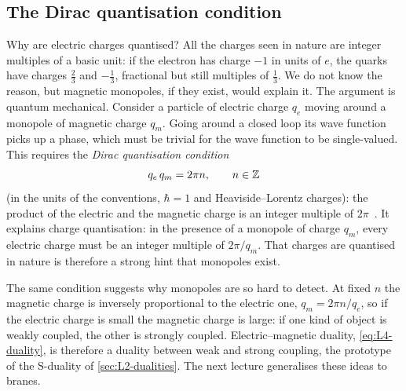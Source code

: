 \subsection{The Dirac quantisation condition}

Why are electric charges quantised? All the charges seen in nature are integer multiples of a basic unit: if the electron has charge $-1$ in units of $e$, the quarks have charges $\frac23$ and $-\frac13$, fractional but still multiples of $\frac13$. We do not know the reason, but magnetic monopoles, if they exist, would explain it. The argument is quantum mechanical. Consider a particle of electric charge $q_e$ moving around a monopole of magnetic charge $q_m$. Going around a closed loop its wave function picks up a phase, which must be trivial for the wave function to be single-valued. This requires the \emph{Dirac quantisation condition}
\begin{equation}
  q_e\,q_m = 2\pi n ,\qquad n\in\mathbb{Z}
  \label{eq:L4-dirac}
\end{equation}
(in the units of the conventions, $\hbar = 1$ and Heaviside--Lorentz charges): the product of the electric and the magnetic charge is an integer multiple of $2\pi$~\cite{Dirac}. It explains charge quantisation: in the presence of a monopole of charge $q_m$, every electric charge must be an integer multiple of $2\pi/q_m$. That charges are quantised in nature is therefore a strong hint that monopoles exist.

The same condition suggests why monopoles are so hard to detect. At fixed $n$ the magnetic charge is inversely proportional to the electric one, $q_m = 2\pi n/q_e$, so if the electric charge is small the magnetic charge is large: if one kind of object is weakly coupled, the other is strongly coupled. Electric--magnetic duality, \cref{eq:L4-duality}, is therefore a duality between weak and strong coupling, the prototype of the S-duality of \cref{sec:L2-dualities}. The next lecture generalises these ideas to branes.
